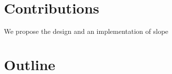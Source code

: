 % 
% 
% 
% 
% 
% 

\section{Contributions}
We propose the design and an implementation of slope




\section{Outline}

